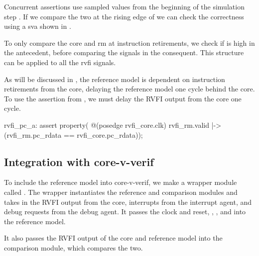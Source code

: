 Concurrent assertions use sampled values from the beginning of the simulation step \cite{cernySVAPowerAssertions2015}. 
If we compare the two at the rising edge of  we can check the correctness using a \acrshort{sva} shown in . 

To only compare the core and \acrshort{rm} at instruction retirements, we check if  is high in the antecedent, before comparing the  signals in the consequent. This structure can be applied to all the \acrshort{rvfi} signals.

As will be discussed in , the reference model is dependent on instruction retirements from the core, delaying the reference model one cycle behind the core. To use the assertion from , we must delay the RVFI output from the core one cycle.

\begin{systemverilog}[caption={Assertion comparing the PC of the \acrshort{rm} and core.}, label={lst:pc_assertion}]
rvfi_pc_a: assert property( @(posedge rvfi_core.clk)
    rvfi_rm.valid |-> (rvfi_rm.pc_rdata == rvfi_core.pc_rdata));
\end{systemverilog}




\subsection{Integration with core-v-verif}

To include the reference model into core-v-verif, we make a wrapper module called . The wrapper instantiates the reference and comparison modules and takes in the RVFI output from the core, interrupts from the interrupt agent, and debug requests from the debug agent. It passes the clock and reset, , , and  into the reference model.

It also passes the RVFI output of the core and reference model into the comparison module, which compares the two.



